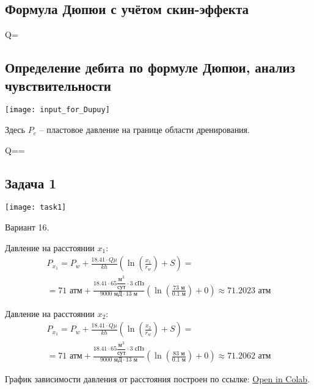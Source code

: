 \documentclass[main.tex]{subfiles}
\begin{document}
\subsection{Формула Дюпюи с учётом скин-эффекта}

\beq
Q=
\eeq

\subsection{Определение дебита по формуле Дюпюи, анализ чувствительности}

\texttt{[image: input\_for\_Dupuy]}

Здесь $P_e$ -- пластовое давление на границе области дренирования.

\beq
Q==
\eeq

\subsection{Задача 1}

\texttt{[image: task1]}

Вариант 16.

Давление на расстоянии $x_1$:
\begin{multline}
P_{x_1}=P_w+\frac{18.41\cdot Q\mu}{kh}\left(\ln{\left(\frac{x_1}{r_w}\right)+S}\right)
=\\=71\text{ атм}+\frac{18.41\cdot 65\dfrac{\text{м}^3}{\text{сут}}\cdot3\text{ сПз}}{9000\text{ мД}\cdot 13\text{ м}}\left(\ln{\left(\frac{73\text{ м}}{0.1\text{ м}}\right)}+0\right)\approx 71.2023\text{ атм}
\end{multline}

Давление на расстоянии $x_2$:
\begin{multline}
P_{x_1}=P_w+\frac{18.41\cdot Q\mu}{kh}\left(\ln{\left(\frac{x_2}{r_w}\right)+S}\right)
=\\=71\text{ атм}+\frac{18.41\cdot 65\dfrac{\text{м}^3}{\text{сут}}\cdot3\text{ сПз}}{9000\text{ мД}\cdot 13\text{ м}}\left(\ln{\left(\frac{83\text{ м}}{0.1\text{ м}}\right)}+0\right)\approx 71.2062\text{ атм}
\end{multline}

График зависимости давления от расстояния построен по ссылке: \href{https://colab.research.google.com/github/mualal/notebooks-source/blob/master/6_pressure.ipynb}{Open in Colab}.
\end{document}
